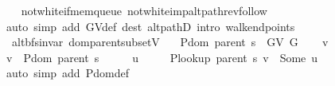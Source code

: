 \begin{isabellebody}
\endisataginvisible
{\isafoldinvisible}%
%
\isadeliminvisible
\isanewline
%
\endisadeliminvisible
%
\isadelimproof
\ \ %
\endisadelimproof
%
\isatagproof
{}\isamarkupfalse%
\ not{\isacharunderscore}{\kern0pt}white{\isacharunderscore}{\kern0pt}if{\isacharunderscore}{\kern0pt}mem{\isacharunderscore}{\kern0pt}queue\ not{\isacharunderscore}{\kern0pt}white{\isacharunderscore}{\kern0pt}imp{\isacharunderscore}{\kern0pt}alt{\isacharunderscore}{\kern0pt}path{\isacharunderscore}{\kern0pt}rev{\isacharunderscore}{\kern0pt}follow\isanewline
\ \ \isamarkupfalse%
\ {\isacharparenleft}{\kern0pt}auto\ simp\ add{\isacharcolon}{\kern0pt}\ G{\isachardot}{\kern0pt}V{\isacharunderscore}{\kern0pt}def\ dest{\isacharcolon}{\kern0pt}\ alt{\isacharunderscore}{\kern0pt}pathD{\isacharparenleft}{\kern0pt}{}{\isacharparenright}{\kern0pt}\ intro{\isacharcolon}{\kern0pt}\ walk{\isacharunderscore}{\kern0pt}endpoints{\isacharparenleft}{\kern0pt}{}{\isacharparenright}{\kern0pt}{\isacharparenright}{\kern0pt}%
\endisatagproof
{\isafoldproof}%
%
\isadelimproof
\isanewline
%
\endisadelimproof
%
\isadeliminvisible
\isanewline
%
\endisadeliminvisible
%
\isataginvisible
{}\isamarkupfalse%
\ {\isacharparenleft}{\kern0pt}\ alt{\isacharunderscore}{\kern0pt}bfs{\isacharunderscore}{\kern0pt}invar{\isacharparenright}{\kern0pt}\ dom{\isacharunderscore}{\kern0pt}parent{\isacharunderscore}{\kern0pt}subset{\isacharunderscore}{\kern0pt}V{\isacharcolon}{\kern0pt}\isanewline
\ \ \ {\isachardoublequoteopen}P{\isachardot}{\kern0pt}dom\ {\isacharparenleft}{\kern0pt}parent\ s{\isacharparenright}{\kern0pt}\ {\isasymsubseteq}\ G{\isachardot}{\kern0pt}V\ G{\isachardoublequoteclose}%
\endisataginvisible
{\isafoldinvisible}%
%
\isadeliminvisible
\isanewline
%
\endisadeliminvisible
%
\isadelimproof
%
\endisadelimproof
%
\isatagproof
{}\isamarkupfalse%
\isanewline
\ \ \isamarkupfalse%
\ v\isanewline
\ \ \isamarkupfalse%
\ {\isachardoublequoteopen}v\ {\isasymin}\ P{\isachardot}{\kern0pt}dom\ {\isacharparenleft}{\kern0pt}parent\ s{\isacharparenright}{\kern0pt}{\isachardoublequoteclose}\isanewline
\ \ \isamarkupfalse%
\ \isamarkupfalse%
\ u\ \isanewline
\ \ \ \ {\isachardoublequoteopen}P{\isacharunderscore}{\kern0pt}lookup\ {\isacharparenleft}{\kern0pt}parent\ s{\isacharparenright}{\kern0pt}\ v\ {\isacharequal}{\kern0pt}\ Some\ u{\isachardoublequoteclose}\isanewline
\ \ \ \ \isamarkupfalse%
\ {\isacharparenleft}{\kern0pt}auto\ simp\ add{\isacharcolon}{\kern0pt}\ P{\isachardot}{\kern0pt}dom{\isacharunderscore}{\kern0pt}def{\isacharparenright}{\kern0pt}\isanewline

\end{isabellebody}
